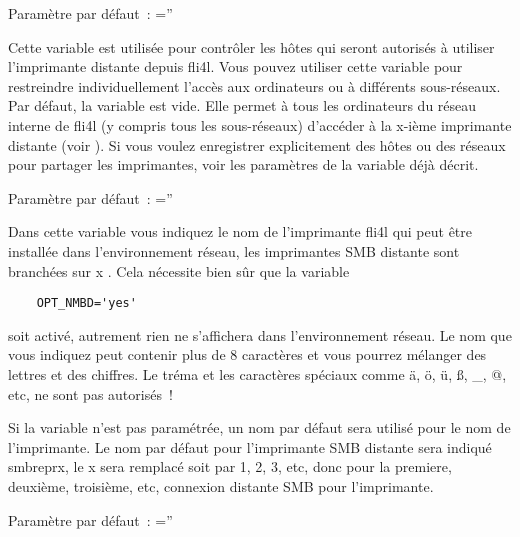 \begin{description}
    Paramètre par défaut~: =''



    Cette variable est utilisée pour contrôler les hôtes qui seront autorisés
    à utiliser l'imprimante distante depuis fli4l. Vous pouvez utiliser cette
    variable pour restreindre individuellement l'accès aux ordinateurs ou à
    différents sous-réseaux. Par défaut, la variable est vide. Elle permet à
    tous les ordinateurs du réseau interne de fli4l (y compris tous les sous-réseaux)
    d'accéder à la x-ième imprimante distante (voir ).
    Si vous voulez enregistrer explicitement des hôtes ou des réseaux pour
    partager les imprimantes, voir les paramètres de la variable
     déjà décrit.

    Paramètre par défaut~: =''



    Dans cette variable vous indiquez le nom de l'imprimante fli4l qui peut
    être installée dans l'environnement réseau, les imprimantes SMB distante
    sont branchées sur x .
    Cela nécessite bien sûr que la variable

\begin{example}
\begin{verbatim}
    OPT_NMBD='yes'
\end{verbatim}
\end{example}

    soit activé, autrement rien ne s'affichera dans l'environnement réseau. Le
    nom que vous indiquez peut contenir plus de 8 caractères et vous pourrez
    mélanger des lettres et des chiffres. Le tréma et les caractères spéciaux
    comme ä, ö, ü, ß, \_, @, etc, ne sont pas autorisés~!

    Si la variable n'est pas paramétrée, un nom par défaut sera utilisé pour le
    nom de l'imprimante. Le nom par défaut pour l'imprimante SMB distante sera
    indiqué smbreprx, le x sera remplacé soit par 1, 2, 3, etc, donc pour
    la premiere, deuxième, troisième, etc, connexion distante SMB pour l'imprimante.

    Paramètre par défaut~: =''



\end{description}
